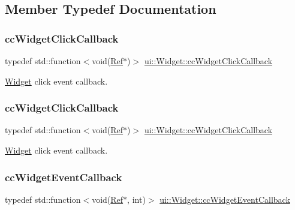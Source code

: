\subsection{Member Typedef Documentation}
\mbox{\label{classui_1_1Widget_a01110bd071334e41c48ee0bec593db61}} 
\subsubsection{\texorpdfstring{cc\+Widget\+Click\+Callback}{ccWidgetClickCallback}\hspace{0.1cm}{\footnotesize\ttfamily [1/2]}}
{\footnotesize\ttfamily typedef std\+::function$<$void(\hyperlink{classRef}{Ref}$\ast$)$>$ \hyperlink{classui_1_1Widget_a01110bd071334e41c48ee0bec593db61}{ui\+::\+Widget\+::cc\+Widget\+Click\+Callback}}

\hyperlink{classui_1_1Widget}{Widget} click event callback. \mbox{\label{classui_1_1Widget_a01110bd071334e41c48ee0bec593db61}} 
\subsubsection{\texorpdfstring{cc\+Widget\+Click\+Callback}{ccWidgetClickCallback}\hspace{0.1cm}{\footnotesize\ttfamily [2/2]}}
{\footnotesize\ttfamily typedef std\+::function$<$void(\hyperlink{classRef}{Ref}$\ast$)$>$ \hyperlink{classui_1_1Widget_a01110bd071334e41c48ee0bec593db61}{ui\+::\+Widget\+::cc\+Widget\+Click\+Callback}}

\hyperlink{classui_1_1Widget}{Widget} click event callback. \mbox{\label{classui_1_1Widget_a15b83a56c3c29442ec103100b45e56c7}} 
\subsubsection{\texorpdfstring{cc\+Widget\+Event\+Callback}{ccWidgetEventCallback}\hspace{0.1cm}{\footnotesize\ttfamily [1/2]}}
{\footnotesize\ttfamily typedef std\+::function$<$void(\hyperlink{classRef}{Ref}$\ast$, int)$>$ \hyperlink{classui_1_1Widget_a15b83a56c3c29442ec103100b45e56c7}{ui\+::\+Widget\+::cc\+Widget\+Event\+Callback}}

